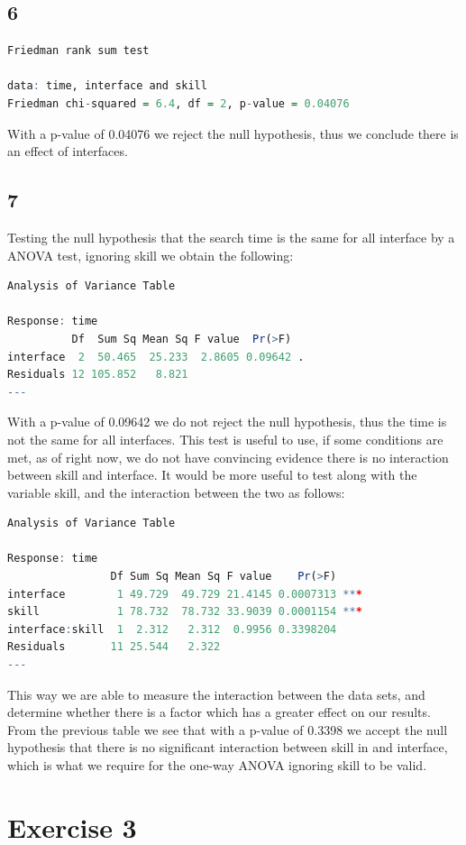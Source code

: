\documentclass{article}
\begin{document}
    \subsection*{6}
	\begin{lstlisting}[language=R]
Friedman rank sum test

data: time, interface and skill
Friedman chi-squared = 6.4, df = 2, p-value = 0.04076
	\end{lstlisting}
	With a p-value of 0.04076 we reject the null hypothesis, thus we conclude there is an effect of interfaces.
    \subsection*{7}
    Testing the null hypothesis that the search time is the same for all interface by a ANOVA test, ignoring skill we obtain the following:
    \begin{lstlisting}[language=R]
    Analysis of Variance Table

Response: time
          Df  Sum Sq Mean Sq F value  Pr(>F)  
interface  2  50.465  25.233  2.8605 0.09642 .
Residuals 12 105.852   8.821                  
---
	\end{lstlisting}
	With a p-value of 0.09642 we do not reject the null hypothesis, thus the time is not the same for all interfaces.
	This test is useful to use, if some conditions are met, as of right now, we do not have convincing evidence there is no interaction between skill and interface. It would be more useful to test along with the variable skill, and the interaction between the two as follows:
	    \begin{lstlisting}[language=R]
	Analysis of Variance Table

Response: time
                Df Sum Sq Mean Sq F value    Pr(>F)    
interface        1 49.729  49.729 21.4145 0.0007313 ***
skill            1 78.732  78.732 33.9039 0.0001154 ***
interface:skill  1  2.312   2.312  0.9956 0.3398204    
Residuals       11 25.544   2.322                      
---
	\end{lstlisting}
	This way we are able to measure the interaction between the data sets, and determine whether there is a factor which has a greater effect on our results. From the previous table we see that with a p-value of 0.3398 we accept the null hypothesis that there is no significant interaction between skill in and interface, which is what we require for the one-way ANOVA ignoring skill to be valid.
  \section*{Exercise 3}
\end{document}
